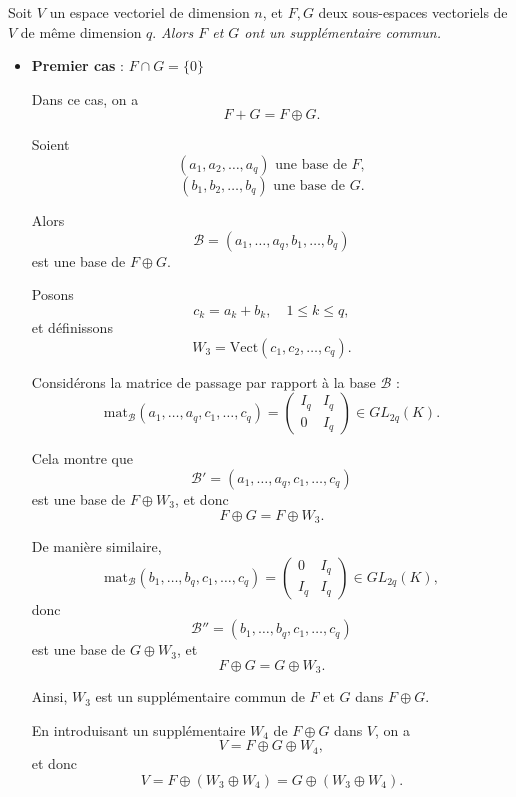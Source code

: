 \begin{res}
	Soit \( V \) un espace vectoriel de dimension \( n \), et \( F, G \) deux sous-espaces vectoriels de \( V \) de même dimension \( q \).
	 \emph{Alors \( F \) et \( G \) ont un supplémentaire commun.}
	 \end{res}
\begin{solution}
	\begin{itemize}
		\item \textbf{Premier cas} : \( F \cap G = \{0\} \)
		
		Dans ce cas, on a
		\[
		F + G = F \oplus G.
		\]
		
		Soient
		\[
		(a_1, a_2, \dots, a_q) \text{ une base de } F,
		\]  
		\[
		(b_1, b_2, \dots, b_q) \text{ une base de } G.
		\]
 		
		Alors
		\[
		\mathcal{B} = (a_1, \dots, a_q, b_1, \dots, b_q)
		\]
		est une base de \( F \oplus G \).
		
		Posons
		\[
		c_k = a_k + b_k, \quad 1 \leq k \leq q,
		\]
		et définissons
		\[
		W_3 = \mathrm{Vect}(c_1, c_2, \dots, c_q).
		\]
		
		Considérons la matrice de passage par rapport à la base \( \mathcal{B} \) :
		\[
		\mathrm{mat}_{\mathcal{B}}(a_1, \dots, a_q, c_1, \dots, c_q)
		= 
		\begin{pmatrix}
			I_q & I_q \\
			0 & I_q
		\end{pmatrix} \in GL_{2q}(K).
		\]
		
		Cela montre que
		\[
		\mathcal{B}' = (a_1, \dots, a_q, c_1, \dots, c_q)
		\]
		est une base de \( F \oplus W_3 \), et donc
		\[
		F \oplus G = F \oplus W_3.
		\]
		
		De manière similaire,
		\[
		\mathrm{mat}_{\mathcal{B}}(b_1, \dots, b_q, c_1, \dots, c_q)
		= 
		\begin{pmatrix}
			0 & I_q \\
			I_q & I_q
		\end{pmatrix} \in GL_{2q}(K),
		\]
		donc
		\[
		\mathcal{B}'' = (b_1, \dots, b_q, c_1, \dots, c_q)
		\]
		est une base de \( G \oplus W_3 \), et
		\[
		F \oplus G = G \oplus W_3.
		\]
		
		Ainsi, \( W_3 \) est un supplémentaire commun de \( F \) et \( G \) dans \( F \oplus G \).
		
		En introduisant un supplémentaire \( W_4 \) de \( F \oplus G \) dans \( V \), on a
		\[
		V = F \oplus G \oplus W_4,
		\]
		et donc
		\[
		V = F \oplus (W_3 \oplus W_4) = G \oplus (W_3 \oplus W_4).
		\]
		

\end{itemize}
\end{solution}
